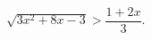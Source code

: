 \begin{ex}[type=inequality]
	\begin{condition}
		$\sqrt{3x^2 + 8x - 3}>\dfrac{1 + 2x}{3} .$
	\end{condition}
\end{ex}